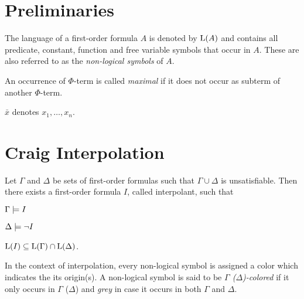 \section{Preliminaries}

The language of a first-order formula $A$ is denoted by $\mathrm{L}(A)$ and contains all predicate, constant, function and free variable symbols that occur in $A$.
These are also referred to as the \emph{non-logical symbols} of $A$.

An occurrence of $\Phi$-term is called \emph{maximal} if it does not occur as subterm of another $\Phi$-term.

$\bar x$ denotes $x_1, \ldots, x_n$.



\section{Craig Interpolation}


\begin{samepage}
	\begin{thm}[Interpolation]
		\label{thm:interpolation}
		Let $\Gamma$ and $\Delta$ be sets of first-order formulas such that $ \Gamma \cup \Delta $ is unsatisfiable.
		Then there exists a first-order formula $I$, called interpolant, such that \nopagebreak[4]
		\begin{compactenum}
		\item $ \Gamma \models I$ \label{int_1}
		\item $ \Delta \models \lnot I$  \label{int_2}
		\item $ \mathrm{L}(I) \subseteq \mathrm{L}(\Gamma) \cap \mathrm{L}(\Delta)$.  \label{int_3}
			\thmqed
		\end{compactenum}
	\end{thm}
\end{samepage}

In the context of interpolation, every non-logical symbol is assigned a color which indicates the its origin(s). 
A non-logical symbol is said to be \emph{$\Gamma$ ($\Delta$)-colored} if it only occurs in $\Gamma$ ($\Delta$) and \emph{grey} in case it occurs in both $\Gamma$ and $\Delta$.
